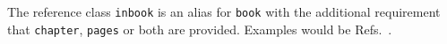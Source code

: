 \documentclass[a4paper,twocolumn,11pt]{quantumarticle}
\begin{document}
The reference class \texttt{inbook} is an alias for \texttt{book} with the additional requirement that \texttt{chapter}, \texttt{pages} or both are provided.
Examples would be Refs.~.













\end{document}

